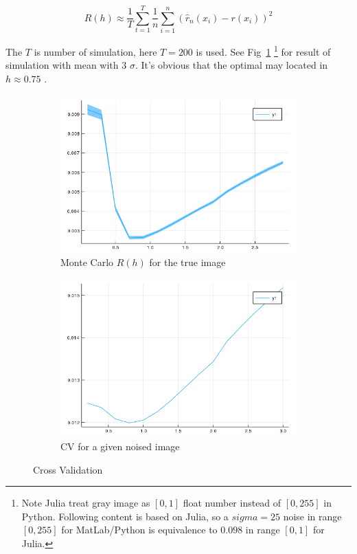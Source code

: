 \documentclass{article}
\begin{document}
$$
R(h) \approx \frac{1}{T} \sum_{t=1}^T \frac{1}{n}\sum_{i=1}^n(\hat{r}_n(x_i)-r(x_i))^2
$$

The $T$ is number of simulation, here $T=200$ is used. See Fig~\ref{fig:crossvalidation}
\footnote{Note Julia treat gray image as $[0,1]$ float number instead of $[0,255]$ in Python. Following content is based on Julia,
so a $sigma=25$ noise in range $[0,255]$ for MatLab/Python is equivalence to $0.098$ in range $[0,1]$ for Julia.}
 for result of simulation with mean with 3 $\sigma$. 
It's obvious that the optimal may located in $h \approx 0.75$ .

\begin{figure}[htb]
  \centering
  \begin{subfigure}[b]{0.49\linewidth}
    \includegraphics[width=\linewidth]{images/crossvalidation1.png}
    \caption{Monte Carlo $R(h)$ for the true image}
  \end{subfigure}
  \begin{subfigure}[b]{0.49\linewidth}
    \includegraphics[width=\linewidth]{images/crossvalidation2.png}
    \caption{CV for a given noised image}
  \end{subfigure}
  \caption{Cross Validation}
  \label{fig:crossvalidation}
\end{figure}
\end{document}
